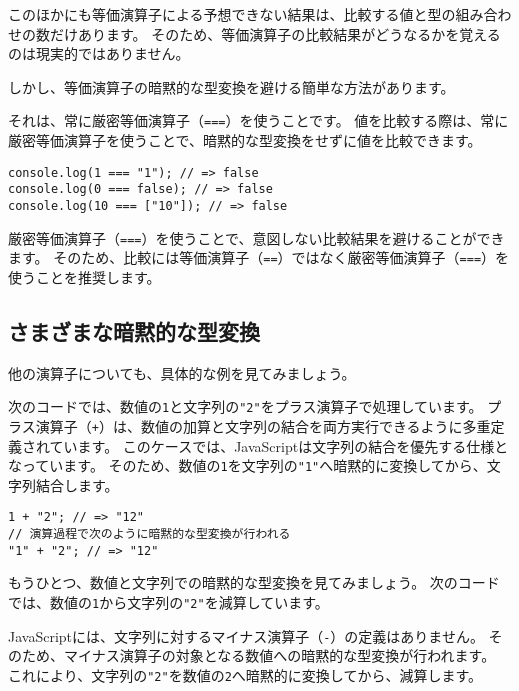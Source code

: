 このほかにも等価演算子による予想できない結果は、比較する値と型の組み合わせの数だけあります。
そのため、等価演算子の比較結果がどうなるかを覚えるのは現実的ではありません。

しかし、等価演算子の暗黙的な型変換を避ける簡単な方法があります。

それは、常に厳密等価演算子（\texttt{===}）を使うことです。
値を比較する際は、常に厳密等価演算子を使うことで、暗黙的な型変換をせずに値を比較できます。

\begin{lstlisting}
console.log(1 === "1"); // => false
console.log(0 === false); // => false
console.log(10 === ["10"]); // => false
\end{lstlisting}

厳密等価演算子（\texttt{===}）を使うことで、意図しない比較結果を避けることができます。
そのため、比較には等価演算子（\texttt{==}）ではなく厳密等価演算子（\texttt{===}）を使うことを推奨します。

\hypertarget{various-implicit-coercion}{%
\subsection{さまざまな暗黙的な型変換}\label{various-implicit-coercion}}

他の演算子についても、具体的な例を見てみましょう。

次のコードでは、数値の\texttt{1}と文字列の\texttt{"2"}をプラス演算子で処理しています。
プラス演算子（\texttt{+}）は、数値の加算と文字列の結合を両方実行できるように多重定義されています。
このケースでは、JavaScriptは文字列の結合を優先する仕様となっています。
そのため、数値の\texttt{1}を文字列の\texttt{"1"}へ暗黙的に変換してから、文字列結合します。

\begin{lstlisting}
1 + "2"; // => "12"
// 演算過程で次のように暗黙的な型変換が行われる
"1" + "2"; // => "12"
\end{lstlisting}

もうひとつ、数値と文字列での暗黙的な型変換を見てみましょう。
次のコードでは、数値の\texttt{1}から文字列の\texttt{"2"}を減算しています。

JavaScriptには、文字列に対するマイナス演算子（\texttt{-}）の定義はありません。
そのため、マイナス演算子の対象となる数値への暗黙的な型変換が行われます。
これにより、文字列の\texttt{"2"}を数値の\texttt{2}へ暗黙的に変換してから、減算します。

